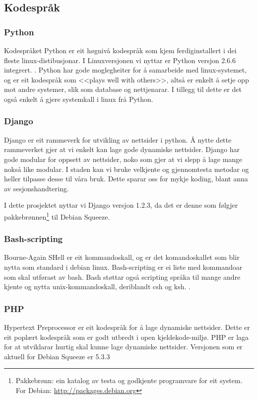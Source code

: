\documentclass[nynorsk,12pt,a4paper,oneside]{book}
\begin{document}
\subsection{Kodespråk}
\subsubsection{Python}
Kodespråket Python er eit høgnivå kodespråk som kjem ferdiginstallert i dei fleste linux-distibusjonar. I Linuxversjonen vi nyttar er Python versjon 2.6.6 integrert. \cite{pythonversjon}. 
Python har gode moglegheiter for å samarbeide med linux-systemet, og er eit kodespråk som <<plays well with others>>, altså er enkelt å setje opp mot andre systemer, slik som database og nettjenarar. \cite{python, pythonapps} I tillegg til dette er det også enkelt å gjere systemkall i linux frå Python. \cite{pythonsubprocess}


\subsubsection{Django}
Django er eit rammeverk for utvikling av nettsider i python. Å nytte dette rammeverket gjer at vi enkelt kan lage gode dynamiske nettsider. Django har gode modular for oppsett av nettsider, noko som gjer at vi slepp å lage mange nokså like modular. I staden kan vi bruke velkjente og gjennomtesta metodar og heller tilpasse desse til våra bruk. Dette sparar oss for mykje koding, blant anna av sesjonshandtering.\cite{djangowww, djangosessions}

I dette prosjektet nyttar vi Django versjon 1.2.3, da det er denne som følgjer pakkebrønnen\footnote{Pakkebrønn: ein katalog av testa og godkjente programvare for eit system. \\For Debian:  \url{http://packages.debian.org} } til Debian Squeeze. \cite{djangopkg}

\subsubsection{Bash-scripting}
Bourne-Again SHell er eit kommandoskall, og er det komandoskallet som blir nytta som standard i debian linux. \cite{debbash, bashwww} Bash-scripting er ei liste med kommandoar som skal utførast av bash. Bash støttar også scripting språka til mange andre kjente og nytta unix-kommandoskall, deriblandt csh og ksh. \cite{bashabout}.

\subsubsection{PHP}
Hypertext Preprocessor er eit kodespråk for å lage dynamiske nettsider. Dette er eit poplært kodespråk som er godt utbredt i open kjeldekode-miljø. PHP er laga for at utviklarar hurtig skal kunne lage dynamiske nettsider. \cite{phpwww} Versjonen som er aktuell for Debian Squeeze er 5.3.3 \cite{phppkg}
\end{document}
